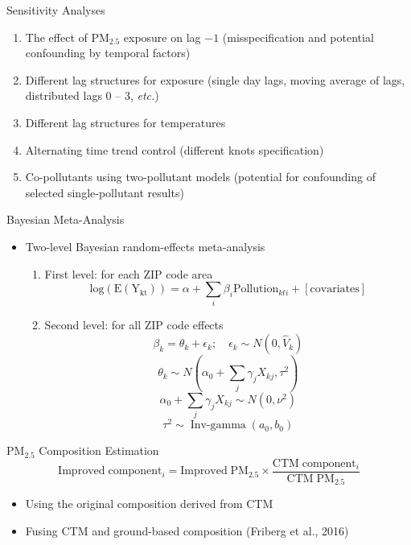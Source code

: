 \documentclass[handout]{beamer} %
\begin{document}
\begin{frame}{Sensitivity Analyses}
    \begin{enumerate}
        \item The effect of PM$_{2.5}$ exposure on lag $-1$ \textcolor[rgb]{0.1,0.1,0.6}{(misspecification and potential confounding by temporal factors)}
        \item Different lag structures for exposure \textcolor[rgb]{0.1,0.1,0.6}{(single day lags, moving average of lags, distributed lags 0 -- 3, \textit{etc.})}
        \item Different lag structures for temperatures
        \item Alternating time trend control \textcolor[rgb]{0.1,0.1,0.6}{(different knots specification)}
        \item Co-pollutants using two-pollutant models \textcolor[rgb]{0.1,0.1,0.6}{(potential for confounding of selected single-pollutant results)}
    \end{enumerate}
\end{frame}

\begin{frame}{Bayesian Meta-Analysis}
    \begin{itemize}
       \item Two-level Bayesian random-effects meta-analysis
        \begin{enumerate}
            \item First level: for each ZIP code area$$ \mathrm{log(E(Y_{kt}))}=\alpha+\sum_i\beta_i\mathrm{Pollution}_{kti}+[\mathrm{covariates}]$$
            \item Second level: for all ZIP code effects
            $$\beta_k=\theta_k+\epsilon_k; \quad \epsilon_k\sim N(0, \hat{V}_k)$$
            $$\theta_k\sim N(\alpha_0+\sum_j\gamma_jX_{kj}, \tau^2)$$
            $$\alpha_0+\sum_j\gamma_jX_{kj} \sim N(0, \nu^2)$$
            $$\tau^2\sim \operatorname{Inv-gamma}(a_0, b_0)$$
        \end{enumerate}
    \end{itemize}
\end{frame}

\begin{frame}{PM$_{2.5}$ Composition Estimation}
    \begin{equation*}
        \mathrm{Improved\;component_\mathit{i}=Improved\;PM_{2.5}\times\frac{CTM\;component_\mathit{i}}{CTM\;PM_{2.5}}}
    \end{equation*}
    \begin{itemize}
        \item Using the original composition derived from CTM
        \item Fusing CTM and ground-based composition (Friberg et al., 2016)
    \end{itemize}
\end{frame}
\end{document}
